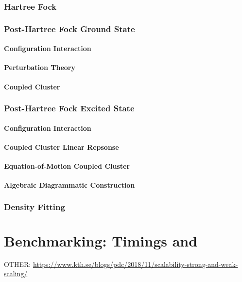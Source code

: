 \documentclass[a4paper,12pt]{article}
\begin{document}
\section{Hartree Fock}

\section{Post-Hartree Fock Ground State}

\subsection{Configuration Interaction}

\subsection{Perturbation Theory}

\subsection{Coupled Cluster}

\section{Post-Hartree Fock Excited State}

\subsection{Configuration Interaction}

\subsection{Coupled Cluster Linear Repsonse}

\subsection{Equation-of-Motion Coupled Cluster}

\subsection{Algebraic Diagrammatic Construction}

\section{Density Fitting}



\part{Benchmarking: Timings and }

OTHER: \url{https://www.kth.se/blogs/pdc/2018/11/scalability-strong-and-weak-scaling/}
\end{document}
